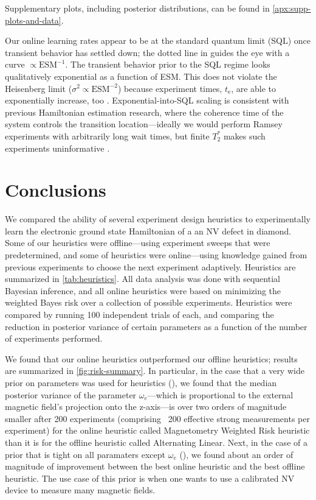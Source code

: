 \documentclass[aps,nofootinbib,twocolumn,superscriptaddress]{revtex4}
\newcommand{\te}{t_\text{e}}
\begin{document}
Supplementary plots, including posterior distributions, can be
found in \autoref{apx:supp-plots-and-data}.

Our online
learning rates appear to be at the standard quantum limit (SQL)
once transient
behavior has settled down; the dotted line in
 guides the eye with a
curve $\propto\text{ESM}^{-1}$.
The transient behavior prior to the SQL regime
looks qualitatively exponential as a function of ESM.
This does not violate the Heisenberg limit
($\sigma^2\propto \text{ESM}^{-2}$) because experiment times,
$\te$, are able to exponentially increase, too
 \cite{sergeevich_characterization_2011}.
Exponential-into-SQL scaling is consistent with previous
Hamiltonian estimation research, where the coherence time of the system
controls the transition location---ideally we would
perform Ramsey experiments with arbitrarily long wait times, but
finite $T_2^*$ makes such experiments uninformative
\cite{ferrie_how_2013}.


\section{Conclusions}
\label{sec:conclusions}

We compared the ability of several experiment design heuristics to
experimentally learn the electronic ground state Hamiltonian of a an
NV defect in diamond.
Some of our heuristics were offline---using experiment sweeps that were
predetermined, and some of heuristics were online---using knowledge gained from
previous experiments to choose the next experiment adaptively.
Heuristics are summarized in \autoref{tab:heuristics}.
All data analysis was done with sequential Bayesian inference,
and all online heuristics were based on minimizing the
weighted Bayes risk over a collection of possible experiments.
Heuristics were compared by running 100 independent trials of each, and comparing
the reduction in posterior variance of certain parameters as a function of
the number of experiments performed.

We found that our online heuristics
outperformed our offline heuristics; results are summarized in
\autoref{fig:risk-summary}.
In particular, in the case that a very wide prior on parameters was used for
heuristics (), we found that the
median posterior variance of the parameter $\omega_e$---which is proportional
to the external magnetic field's projection onto the z-axis---is over two
orders of magnitude smaller after 200 experiments (comprising ~200 effective
strong measurements per experiment) for the online heuristic called
Magnetometry Weighted Risk heuristic than
it is for the offline heuristic called Alternating Linear.
Next, in the case of a prior that is tight on all paramaters except $\omega_e$
(), we found about an order of
magnitude of improvement between the best online heuristic and the
best offline heuristic.
The use case of this prior is when one wants to use a calibrated NV
device to measure many magnetic fields.
\end{document}
